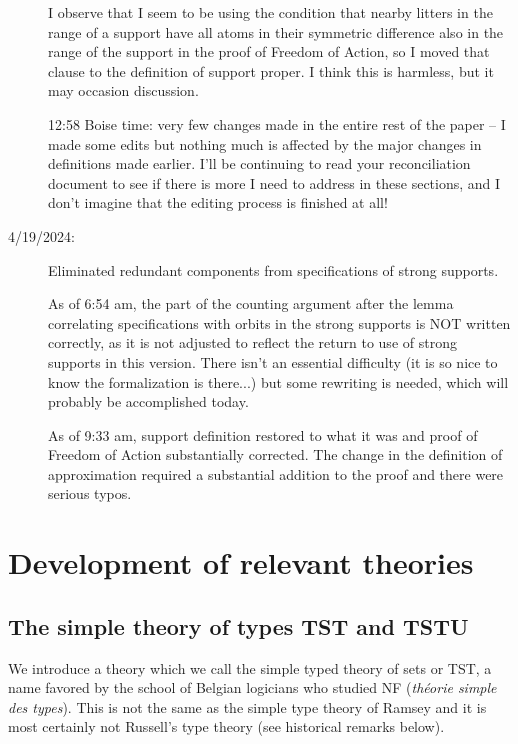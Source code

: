 \documentclass[112pt]{article}
\begin{document}
\begin{description}
I observe that I seem to be using the condition that nearby litters in the range of a support have all atoms in their symmetric difference also in the range of the support in the proof of Freedom of Action, so I moved that clause to the definition of support proper.  I think this is harmless, but it may occasion discussion.

12:58 Boise time:  very few changes made in the entire rest of the paper -- I made some edits but nothing much is affected by the major changes in definitions made earlier.  I'll be continuing to read your reconciliation document to see if there is more I need to address in these sections, and I don't imagine that the editing process is finished at all!

\item[4/19/2024:]  Eliminated redundant components from specifications of strong supports.

As of 6:54 am, the part of the counting argument after the lemma correlating specifications with orbits in the strong supports is NOT written correctly, as it is not adjusted to reflect the return to use of strong supports
in this version.  There isn't an essential difficulty (it is so nice to know the formalization is there...)  but some rewriting is needed, which will probably be accomplished today.

As of 9:33 am, support definition restored to what it was and proof of Freedom of Action substantially corrected.  The change in the definition of approximation required a substantial addition to the proof and there were serious typos.

\end{description}


\newpage

\section{Development of relevant theories}



\subsection{The simple theory of types TST and TSTU}

We introduce a theory which we call the simple typed theory of sets or TST, a name favored by the school of Belgian logicians who studied NF ({\em th\'eorie simple des types}).  This is not the same as the simple type theory of Ramsey and it is most certainly not Russell's type theory  (see historical remarks below).
\end{document}
